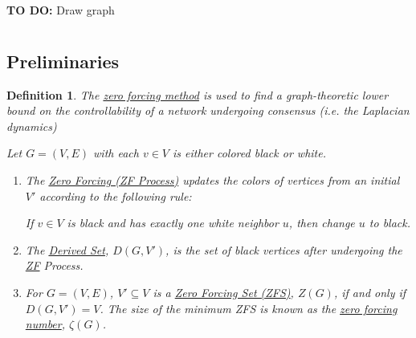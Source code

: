 \documentclass[]{article}
\numberwithin{equation}{section}
\newtheorem{definition}{Definition}
\begin{document}









\textbf{TO DO:} 
Draw graph


\newpage
\section{} 
\subsection*{Preliminaries}
\begin{definition}
    The \emph{\underline{zero forcing method}} is used to find a graph-theoretic lower bound on the controllability of a network undergoing consensus (i.e. the Laplacian dynamics)

    Let $G = (V,E)$ with each $v \in V$ is either colored \emph{black} or \emph{white}.

    \begin{enumerate}
        \item The \emph{\underline{Zero Forcing (ZF Process)}} updates the colors of vertices from an initial $V'$ according to the following rule: 
        
        If $v \in V$ is black and has exactly one white neighbor $u$, then change $u$ to black.
        
        \item The \emph{\underline{Derived Set}}, $D(G,V')$, is the set of \emph{black} vertices after undergoing the \emph{\underline{ZF}} Process. 
        
        \item For $G = (V,E)$, $V' \subseteq V$ is a \emph{\underline{Zero Forcing Set (ZFS)}}, $Z(G)$, if and only if $D(G,V') = V$.
        The size of the minimum ZFS is known as the \emph{\underline{zero forcing number}}, $\zeta(G)$.
    \end{enumerate}
\end{definition}
\end{document}
